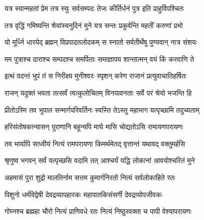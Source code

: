  

\twolineshloka
{यत्र स्यान्महतां प्रेम तत्र स्युः सर्वसम्पदः}
{तेजः कीर्तिर्धनं पुत्र इति प्राहुर्विपश्चितः}%

 

\twolineshloka
{तत्र वृद्धिं गमिष्यन्ति श्रेयांस्यनुदिनं मुने}
{यत्र सन्तः प्रकुर्वन्ति महतीं करुणां प्रभो}%

 

\twolineshloka
{यो मूर्ध्नि धारयेद् ब्रह्मन् विप्रपादतलोदकम्}
{स स्नातो सर्वतीर्थेषु पुण्यवान् नात्र संशयः}%

 

\twolineshloka
{मम पुत्राश्च दाराश्च सम्पदश्च समर्पिताः}
{समाज्ञापय शान्तात्मन् वयं किं करवाणि ते}%

 

\twolineshloka
{इत्थं वदन्तं भूपं तं स निरीक्ष्य मुनीश्वरः}
{स्पृशन् करेण राजानं प्रत्युवाचातिहर्षितः}%

 


\twolineshloka
{राजन् यदुक्तं भवता तत्सर्वं त्वत्कुलोचितम्}
{विनयावनताः सर्वे परं श्रेयो भजन्ति हि}%

 

\twolineshloka
{प्रीतोऽस्मि तव भूपाल सन्मार्गपरिवर्तिनः}
{स्वस्ति तेऽस्तु महाभाग यत्पृच्छामि तदुच्यताम्}%

 

\twolineshloka
{हरिसंतोषकान्यासन् पुराणानि बहून्यपि}
{माघे मासि चोद्यतोऽसि रामायणपरायणः}%

 

\twolineshloka
{तव भार्यापि साध्वीयं नित्यं रामपरायणा}
{किमर्थमेतद् वृत्तान्तं यथावद् वक्तुमर्हसि}%

 


\twolineshloka
{श्रृणुष्व भगवन् सर्वं यत्पृच्छसि वदामि तत्}
{आश्चर्यं यद्धि लोकानां आवयोश्चरितं मुने}%

 

\twolineshloka
{अहमासं पुरा शुद्रो मालतिर्नाम सत्तम}
{कुमार्गनिरतो नित्यं सर्वलोकाहिते रतः}%

 

\twolineshloka
{पिशुनो धर्मविद्वेषी देवद्रव्यापहारकः}
{महापातकिसंसर्गी देवद्रव्योपजीवकः}%

 

\twolineshloka
{गोघ्नश्च ब्रह्महा चौरो नित्यं प्राणिवधे रतः}
{नित्यं निष्ठुरवक्ता च पापी वेश्यापरायणः}%

 

